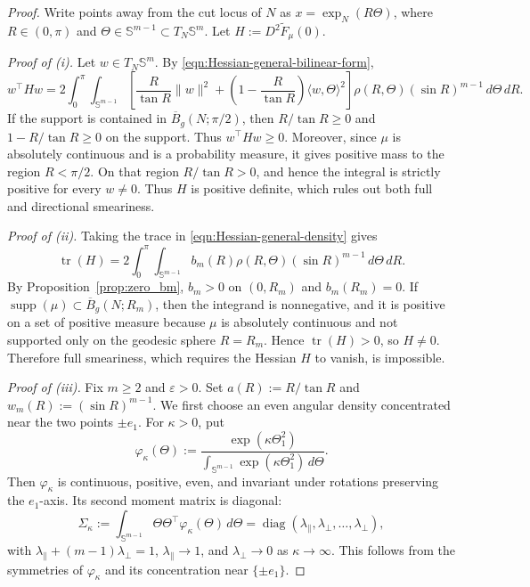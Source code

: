 \documentclass{amsart}
\theoremstyle{definition}
\theoremstyle{remark}
\newcommand\0{\boldsymbol{0}}
\begin{document}
\begin{proof}
Write points away from the cut locus of \(N\) as \(x=\exp_N(R\Theta)\), where \(R\in(0,\pi)\) and \(\Theta\in\mathbb S^{m-1}\subset T_N\mathbb S^m\). Let \(H:=D^2\widetilde F_\mu(0)\).

\emph{Proof of (i).}
Let \(w\in T_N\mathbb S^m\). By \eqref{eqn:Hessian-general-bilinear-form},
\[
w^\top H w
=
2\int_0^\pi\!\!\int_{\mathbb S^{m-1}}
\left[
\frac{R}{\tan R}\|w\|^2+
\left(1-\frac{R}{\tan R}\right)\langle w,\Theta\rangle^2
\right]\rho(R,\Theta)(\sin R)^{m-1}\,d\Theta\,dR .
\]
If the support is contained in \(\overline B_g(N;\pi/2)\), then \(R/\tan R\ge0\) and \(1-R/\tan R\ge0\) on the support. Thus \(w^\top H w\ge0\). Moreover, since \(\mu\) is absolutely continuous and is a probability measure, it gives positive mass to the region \(R<\pi/2\). On that region \(R/\tan R>0\), and hence the integral is strictly positive for every \(w\neq0\). Thus \(H\) is positive definite, which rules out both full and directional smeariness.

\emph{Proof of (ii).}
Taking the trace in \eqref{eqn:Hessian-general-density} gives
\[
\operatorname{tr}(H)
=
2\int_0^\pi\!\!\int_{\mathbb S^{m-1}}
b_m(R)\rho(R,\Theta)(\sin R)^{m-1}\,d\Theta\,dR .
\]
By Proposition~\ref{prop:zero_bm}, \(b_m>0\) on \((0,R_m)\) and \(b_m(R_m)=0\). If \(\operatorname{supp}(\mu)\subset \overline B_g(N;R_m)\), then the integrand is nonnegative, and it is positive on a set of positive measure because \(\mu\) is absolutely continuous and not supported only on the geodesic sphere \(R=R_m\). Hence \(\operatorname{tr}(H)>0\), so \(H\neq0\). Therefore full smeariness, which requires the Hessian $H$ to vanish, is impossible.



\emph{Proof of (iii).}
Fix \(m\ge2\) and \(\varepsilon>0\). Set \(a(R):=R/\tan R\) and \(w_m(R):=(\sin R)^{m-1}\). We first choose an even angular density concentrated near the two points \(\pm e_1\). For \(\kappa>0\), put
\[
\varphi_\kappa(\Theta):=\frac{\exp(\kappa\Theta_1^2)}
{\int_{\mathbb S^{m-1}}\exp(\kappa\Theta_1^2)\,d\Theta}.
\]
Then \(\varphi_\kappa\) is continuous, positive, even, and invariant under rotations preserving the \(e_1\)-axis. Its second moment matrix is diagonal:
\[
\Sigma_\kappa
:=
\int_{\mathbb S^{m-1}}\Theta\Theta^\top\varphi_\kappa(\Theta)\,d\Theta
=
\operatorname{diag}(\lambda_\parallel,\lambda_\perp,\ldots,\lambda_\perp),
\]
with \(\lambda_\parallel+(m-1)\lambda_\perp=1\), \(\lambda_\parallel\to1\), and \(\lambda_\perp\to0\) as \(\kappa\to\infty\). This follows from the symmetries of \(\varphi_\kappa\) and its concentration near \(\{\pm e_1\}\).


\end{proof}
\end{document}
